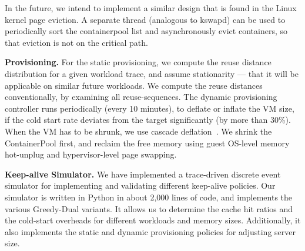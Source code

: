 In the future, we intend to implement a similar design that is found in the Linux kernel page eviction. A separate thread (analogous to kswapd) can be used to periodically sort the containerpool list and asynchronously evict containers, so that eviction is not on the critical path. 





\noindent \textbf{Provisioning.}
For the static provisioning, we compute the reuse distance distribution for a given workload trace, and assume stationarity --- that it will be applicable on similar future workloads. 
We compute the reuse distances conventionally, by examining all reuse-sequences.
The dynamic provisioning controller runs periodically (every 10 minutes), to deflate or inflate the VM size, if the cold start rate deviates from the target significantly (by more than 30\%).
When the VM has to be shrunk, we use cascade deflation~\cite{deflation-eurosys19}.
We shrink the ContainerPool first, and reclaim the free memory using guest OS-level memory hot-unplug and hypervisor-level page swapping. 



\noindent \textbf{Keep-alive Simulator.}
We have implemented a trace-driven discrete event simulator for implementing and validating different keep-alive policies.
Our simulator is written in Python in about 2,000 lines of code, and implements the various Greedy-Dual variants. 
It allows us to determine the cache hit ratios and the cold-start overheads for different workloads and memory sizes.
Additionally, it also implements the static and dynamic provisioning policies for adjusting server size.

